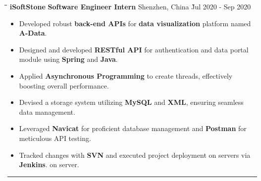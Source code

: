 \documentclass{res}
\begin{document}
\begin{resume}
    \vspace{-0.05in}	
    \begin{tabbing}
    \hspace{1.5in}\= \hspace{2.5in}\= \hspace{1.6in}\= \kill %
        {\bf iSoftStone} \> {\bf Software Engineer Intern}  \>  
                                    Shenzhen, China   \` Jul 2020 - Sep 2020\\
    \end{tabbing}\vspace{-20pt}      %
    \vspace{+0.1in}
    \begin{itemize} \itemsep 1.5pt %
        \item Developed robust {\bf back-end APIs} for {\bf data visualization} 
            platform named {\bf A-Data}.
        \item Designed and developed {\bf RESTful API} for authentication and 
                data portal module using {\bf Spring} and {\bf Java}.
        \item Applied {\bf Asynchronous Programming} to create threads, effectively boosting overall performance.
        \item Devised a storage system utilizing {\bf MySQL} and {\bf XML}, ensuring seamless data management.
        \item Leveraged {\bf Navicat} for proficient database management and {\bf Postman} for meticulous API testing.
        \item Tracked changes with {\bf SVN} and executed project deployment on servers via {\bf Jenkins}.
                on server.
    \end{itemize}

\vspace{+0.05in}

\vspace{-8pt}
\hspace{-0.55in}
\noindent\rule[0.25\baselineskip]{19.36cm}{0.5pt}    
        


\end{resume}
\end{document}
